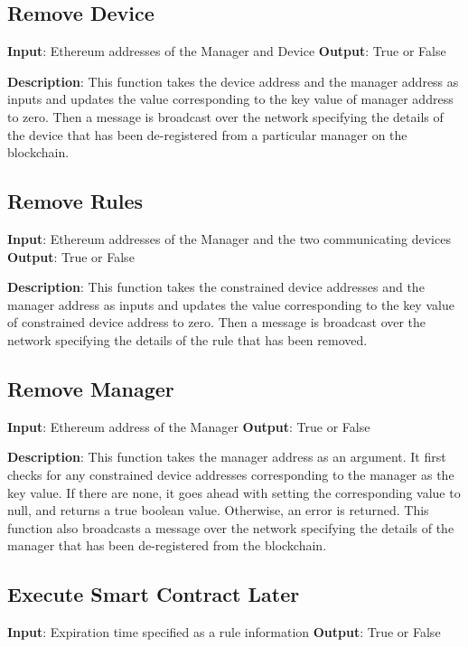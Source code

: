 \documentclass[english]{tktltiki}
\begin{document}
\subsection*{Remove Device}
\textbf{Input}: Ethereum addresses of the Manager and Device\newline
\textbf{Output}: True or False\newline

\textbf{Description}: This function takes the device address and the manager address as inputs and updates the value corresponding to the key value of manager address to zero. Then a message is broadcast over the network specifying the details of the device that has been de-registered from a particular manager on the blockchain.

\subsection*{Remove Rules}
\textbf{Input}: Ethereum addresses of the Manager and the two communicating devices\newline
\textbf{Output}: True or False\newline

\textbf{Description}: This function takes the constrained device addresses and the manager address as inputs and updates the value corresponding to the key value of constrained device address to zero. Then a message is broadcast over the network specifying the details of the rule that has been removed.

\subsection*{Remove Manager}
\textbf{Input}: Ethereum address of the Manager\newline
\textbf{Output}: True or False\newline

\textbf{Description}: This function takes the manager address as an argument. It first checks for any constrained device addresses corresponding to the manager as the key value. If there are none, it goes ahead with setting the corresponding value to null, and returns a true boolean value. Otherwise, an error is returned. This function also broadcasts a message over the network specifying the details of the manager that has been de-registered from the blockchain.

\subsection*{Execute Smart Contract Later}
\textbf{Input}: Expiration time specified as a rule information\newline
\textbf{Output}: True or False\newline
\end{document}
